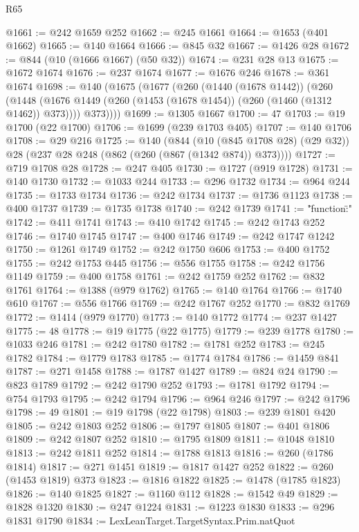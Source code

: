 \begin{lexlean}{R65}
\begin{coremodule}
@1661 := @242 @1659 @252
@1662 := @245 @1661
@1664 := @1653 (@401 @1662)
@1665 := @140 @1664
@1666 := @845 @32
@1667 := @1426 @28
@1672 := @844 (@10 (@1666 @1667) (@50 @32))
@1674 := @231 @28 @13
@1675 := @1672 @1674
@1676 := @237 @1674
@1677 := @1676 @246
@1678 := @361 @1674
@1698 := @140
    (@1675
      (@1677
        (@260
          (@1440 (@1678 @1442))
          (@260
            (@1448 (@1676 @1449 (@260 (@1453 (@1678 @1454)) (@260 (@1460 (@1312 @1462)) @373))))
            @373))))
@1699 := @1305 @1667
@1700 := 47
@1703 := @19 @1700 (@22 @1700)
@1706 := @1699 (@239 @1703 @405)
@1707 := @140 @1706
@1708 := @29 @216
@1725 := @140
    (@844
      (@10 (@845 @1708 @28) (@29 @32))
      @28
      (@237 @28 @248 (@862 (@260 (@867 (@1342 @874)) @373))))
@1727 := @719 @1708 @28
@1728 := @247 @405
@1730 := @1727 (@919 @1728)
@1731 := @140 @1730
@1732 := @1033 @244
@1733 := @296 @1732
@1734 := @964 @244
@1735 := @1733 @1734
@1736 := @242 @1734
@1737 := @1736 @1123
@1738 := @400 @1737
@1739 := @1735 @1738
@1740 := @242 @1739
@1741 := "{\"function\":"
@1742 := @411 @1741
@1743 := @410 @1742
@1745 := @242 @1743 @252
@1746 := @1740 @1745
@1747 := @400 @1746
@1749 := @242 @1747 @1242
@1750 := @1261 @1749
@1752 := @242 @1750 @606
@1753 := @400 @1752
@1755 := @242 @1753 @445
@1756 := @556 @1755
@1758 := @242 @1756 @1149
@1759 := @400 @1758
@1761 := @242 @1759 @252
@1762 := @832 @1761
@1764 := @1388 (@979 @1762)
@1765 := @140 @1764
@1766 := @1740 @610
@1767 := @556 @1766
@1769 := @242 @1767 @252
@1770 := @832 @1769
@1772 := @1414 (@979 @1770)
@1773 := @140 @1772
@1774 := @237 @1427
@1775 := 48
@1778 := @19 @1775 (@22 @1775)
@1779 := @239 @1778
@1780 := @1033 @246
@1781 := @242 @1780
@1782 := @1781 @252
@1783 := @245 @1782
@1784 := @1779 @1783
@1785 := @1774 @1784
@1786 := @1459 @841
@1787 := @271 @1458
@1788 := @1787 @1427
@1789 := @824 @24
@1790 := @823 @1789
@1792 := @242 @1790 @252
@1793 := @1781 @1792
@1794 := @754 @1793
@1795 := @242 @1794
@1796 := @964 @246
@1797 := @242 @1796
@1798 := 49
@1801 := @19 @1798 (@22 @1798)
@1803 := @239 @1801 @420
@1805 := @242 @1803 @252
@1806 := @1797 @1805
@1807 := @401 @1806
@1809 := @242 @1807 @252
@1810 := @1795 @1809
@1811 := @1048 @1810
@1813 := @242 @1811 @252
@1814 := @1788 @1813
@1816 := @260 (@1786 @1814)
@1817 := @271 @1451
@1819 := @1817 @1427 @252
@1822 := @260 (@1453 @1819) @373
@1823 := @1816 @1822
@1825 := @1478 (@1785 @1823)
@1826 := @140 @1825
@1827 := @1160 @112
@1828 := @1542 @49
@1829 := @1828 @1320
@1830 := @247 @1224
@1831 := @1223 @1830
@1833 := @296 @1831 @1790
@1834 := LexLeanTarget.TargetSyntax.Prim.natQuot
}
\end{coremodule}
\end{lexlean}
